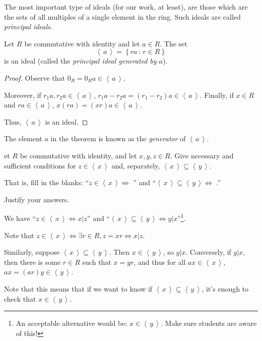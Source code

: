 \documentclass[english,course]{lecture}
\newcommand{\ideal}[1]{\left\langle\, #1 \,\right\rangle}
\theoremstyle{plain}
\newenvironment{question}[1]
  {\renewcommand\theinnerquestion{#1}\innerquestion}
  {\endinnerquestion}
\def\setof#1#2{{\left\{#1\,\colon\,#2\right\}}}
\def\presnotes{}
\begin{document}
\presnotes

The most important type of ideals (for our work, at least), are those which are the sets of all multiples of a single element in the ring.
Such ideals are called \emph{principal ideals}.

\begin{theorem}
	Let $R$ be commutative with identity and let $a\in R$.
	The set
	\[
		\ideal{a} = \setof{ra}{r\in R}
	\]
	is an ideal (called the \emph{principal ideal generated by $a$}).
\end{theorem}

\begin{proof}
	Observe that $0_R = 0_R a \in \ideal{a}$.
	
	Moreover, if $r_1 a, r_2 a\in \ideal{a}$, $r_1 a - r_2 a = (r_1 - r_2)a \in \ideal{a}$.
	Finally, if $x\in R$ and $r a\in \ideal{a}$, $x (ra) = (xr) a \in \ideal{a}$.
	
	Thus, $\ideal{a}$ is an ideal.
\end{proof}

\presnotes

The element $a$ in the theorem is known as the \emph{generator} of $\ideal{a}$.

\begin{question}
	Let $R$ be commutative with identity, and let $x,y,z\in R$.
	Give necessary and sufficient conditions for $z\in \ideal{x}$ and, separately, $\ideal{x} \subseteq \ideal{y}$.
	
	That is, fill in the blanks: ``$z\in \ideal{x} \Leftrightarrow$ \makebox[0.75in]{\hrulefill}'' and ``$\ideal{x}\subseteq \ideal{y} \Leftrightarrow$ \makebox[0.75in]{\hrulefill}.''
	
	Justify your answers.
\end{question}

\begin{answer}
	We have ``$z\in \ideal{x} \Leftrightarrow x|z$'' and ``$\ideal{x}\subseteq \ideal{y} \Leftrightarrow y|x$''\footnote{An acceptable alternative would be: $x\in \ideal{y}$. Make sure students are aware of this!}.
	
	Note that $z\in \ideal{x} \Leftrightarrow \exists r\in R, z = xr \Leftrightarrow x|z$.
	
	Similarly, suppose $\ideal{x}\subseteq \ideal{y}$. Then $x\in \ideal{y}$, so $y|x$. %
	Conversely, if $y|x$, then there is some $r\in R$ such that $x = yr$, and thus for all $ax\in \ideal{x}$, $ax = (ar)y \in \ideal{y}$.
	
	Note that this means that if we want to know if $\ideal{x}\subseteq \ideal{y}$, it's enough to check that $x\in \ideal{y}$.
\end{answer}
\end{document}
